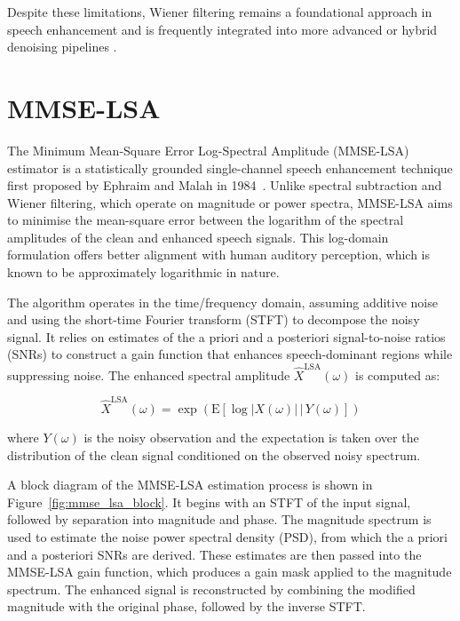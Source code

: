 Despite these limitations, Wiener filtering remains a foundational approach in speech enhancement and is frequently integrated into more advanced or hybrid denoising pipelines \cite{dubey2016evaluation, loizou2013speech}.

\section{MMSE-LSA}
\label{sec:mmse_lsa}

The Minimum Mean-Square Error Log-Spectral Amplitude (MMSE-LSA) estimator is a statistically grounded single-channel speech enhancement technique first proposed by Ephraim and Malah in 1984~\cite{ephraim1984speech}. Unlike spectral subtraction and Wiener filtering, which operate on magnitude or power spectra, MMSE-LSA aims to minimise the mean-square error between the logarithm of the spectral amplitudes of the clean and enhanced speech signals. This log-domain formulation offers better alignment with human auditory perception, which is known to be approximately logarithmic in nature.

The algorithm operates in the time/frequency domain, assuming additive noise and using the short-time Fourier transform (STFT) to decompose the noisy signal. It relies on estimates of the a priori and a posteriori signal-to-noise ratios (SNRs) to construct a gain function that enhances speech-dominant regions while suppressing noise. The enhanced spectral amplitude \( \hat{X}^{\text{LSA}}(\omega) \) is computed as:

\begin{equation}
    \hat{X}^{\text{LSA}}(\omega) = \exp \left( \mathrm{E} \left[ \log |X(\omega)| \,\big|\, Y(\omega) \right] \right)
\end{equation}

where \( Y(\omega) \) is the noisy observation and the expectation is taken over the distribution of the clean signal conditioned on the observed noisy spectrum.

A block diagram of the MMSE-LSA estimation process is shown in Figure~\ref{fig:mmse_lsa_block}. It begins with an STFT of the input signal, followed by separation into magnitude and phase. The magnitude spectrum is used to estimate the noise power spectral density (PSD), from which the a priori and a posteriori SNRs are derived. These estimates are then passed into the MMSE-LSA gain function, which produces a gain mask applied to the magnitude spectrum. The enhanced signal is reconstructed by combining the modified magnitude with the original phase, followed by the inverse STFT.

